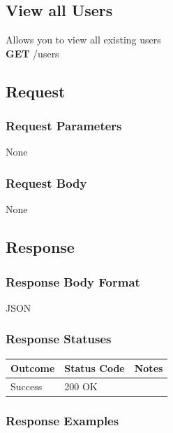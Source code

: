 \documentclass[letterpaper,11pt,titlepage,draftclsnofoot,onecolumn,compsoc,utf8,latin1]{IEEEtran}
\begin{document}
\begin{singlespace}
\section{View all Users}

Allows you to view all existing users\\

\noindent \textbf{GET} /users

\subsection{Request}

\subsubsection{Request Parameters}

None

\subsubsection{Request Body}

None

\subsection{Response}

\subsubsection{Response Body Format}

JSON

\subsubsection{Response Statuses}

\begin{center}
\begin{tabular}{ |p{}|p{}|p{}| } 
 \hline
 \textbf{Outcome} & \textbf{Status Code} & \textbf{Notes}  \\  \hline
 Success & 200 OK &  \\
 \hline
\end{tabular}
\end{center}

\subsubsection{Response Examples}


\end{singlespace}
\end{document}
